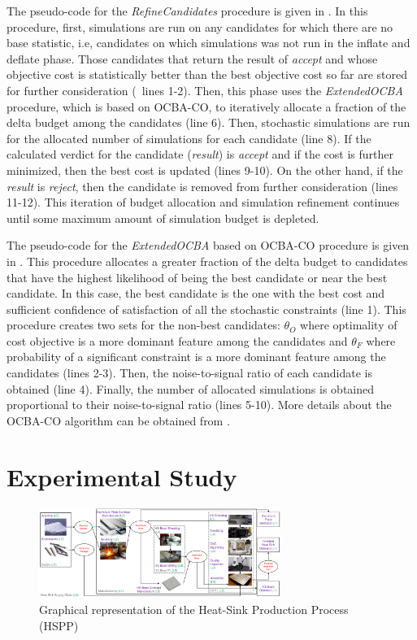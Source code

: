 \documentclass[a4paper, 12pt]{article} %
\begin{document}
The pseudo-code for the \textit{RefineCandidates} procedure is given in \algoRefineCand. 
In this procedure, first, simulations are run on any candidates for which there are no base statistic, i.e, candidates on which simulations was not run in the inflate and deflate phase. Those candidates that return the result of \textit{accept} and whose objective cost is statistically better than the best objective cost so far are stored for further consideration (\algoRefineCand~lines 1-2).
Then, this phase uses the \textit{ExtendedOCBA} procedure, which is based on OCBA-CO, to iteratively allocate a fraction of the delta budget among the candidates (line 6).
Then, stochastic simulations are run for the allocated number of simulations for each candidate (line 8).
If the calculated verdict for the candidate (\textit{result}) is \textit{accept} and if the cost is further minimized, then the best cost is updated (lines 9-10).
On the other hand, if the \textit{result} is \textit{reject}, then the candidate is removed from further consideration (lines 11-12).
This iteration of budget allocation and simulation refinement continues until some maximum amount of simulation budget is depleted.

The pseudo-code for the \textit{ExtendedOCBA} based on OCBA-CO procedure is given in \algoExOCBA.
This procedure allocates a greater fraction of the delta budget to candidates that have the highest likelihood of being the best candidate or near the best candidate. 
In this case, the best candidate is the one with the best cost and sufficient confidence of satisfaction of all the stochastic constraints (line 1).
This procedure creates two sets for the non-best candidates: $\theta_O$ where optimality of cost objective is a more dominant feature among the candidates and $\theta_F$ where probability of a significant constraint is a more dominant feature among the candidates (lines 2-3). 
Then, the noise-to-signal ratio of each candidate is obtained (line 4).
Finally, the number of allocated simulations is obtained proportional to their noise-to-signal ratio (lines 5-10). 
More details about the OCBA-CO algorithm can be obtained from \cite{Lee2012OCBACO}.

\section{Experimental Study}
\label{sec:expResults}

\begin{figure}[b]
	\begin{center}
		\includegraphics[width=0.7\textwidth]{images/HeatSink_contractSN.pdf}
		\caption{Graphical representation of the Heat-Sink Production Process (HSPP)}
		\label{fig:heatsinkSC}       %
	\end{center}
\end{figure}
\end{document}
